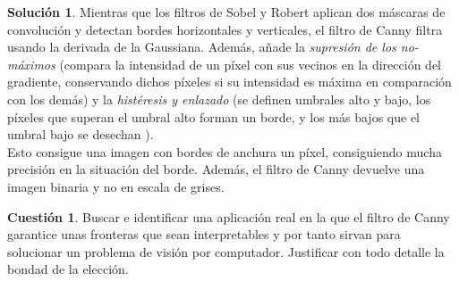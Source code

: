 \documentclass[a4paper, 11pt]{article}
\theoremstyle{definition}
\newtheorem{cuestion}{Cuestión}
\newtheorem*{solucion}{Solución}
\begin{document}
  \begin{solucion}
     	Mientras que los filtros de Sobel y Robert aplican dos máscaras de convolución
      y detectan bordes horizontales y verticales, el filtro de Canny filtra usando
      la derivada de la Gaussiana. Además, añade la \textit{supresión de los no-máximos}
      (compara la intensidad de un píxel con sus vecinos en la dirección del gradiente,
      conservando dichos píxeles si su intensidad es máxima en comparación con los demás)
      y la \textit{histéresis y enlazado} (se definen umbrales alto y bajo, los píxeles
      que superan el umbral alto forman un borde, y los más bajos que el umbral bajo
      se desechan ). \\

      Esto consigue una imagen con bordes de anchura un píxel, consiguiendo mucha precisión
      en la situación del borde. Además, el filtro de Canny devuelve una imagen
      binaria y no en escala de grises.
  \end{solucion}

  \begin{cuestion}
     	Buscar e identificar una aplicación real en la que el filtro de
      Canny garantice unas fronteras que sean interpretables y por tanto sirvan
      para solucionar un problema de visión por computador.
      Justificar con todo detalle la bondad de la elección.

  \end{cuestion}
\end{document}

